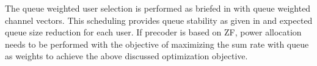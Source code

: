The queue weighted user selection is performed as briefed in \cite{sus2006zfbf,sun2009eigenmode} with queue weighted channel vectors. This scheduling provides queue stability as given in \cite{neely2012stability} and expected queue size reduction for each user. If precoder is based on ZF, power allocation needs to be performed with the objective of maximizing the sum rate with queue as weights to achieve the above discussed optimization objective.

